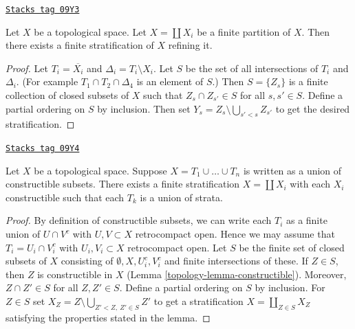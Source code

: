 \begin{lemma}
\label{topology-lemma-partition-refined-by-stratification}
\href{https://stacks.math.columbia.edu/tag/09Y3}{\texttt{Stacks tag 09Y3}}

Let $X$ be a topological space. Let $X = \coprod X_i$ be a finite partition
of $X$. Then there exists a finite stratification of $X$ refining it.
\end{lemma}

\begin{proof}
Let $T_i = \overline{X_i}$ and $\Delta_i = T_i \setminus X_i$.
Let $S$ be the set of all intersections of $T_i$ and $\Delta_i$.
(For example $T_1 \cap T_2 \cap \Delta_4$ is an element of $S$.)
Then $S = \{Z_s\}$ is a finite collection of closed subsets of $X$ such that
$Z_s \cap Z_{s'} \in S$ for all $s, s' \in S$. Define a partial ordering
on $S$ by inclusion. Then set $Y_s = Z_s \setminus \bigcup_{s' < s} Z_{s'}$
to get the desired stratification.
\end{proof}

\begin{lemma}
\label{topology-lemma-constructible-partition-refined-by-stratification}
\href{https://stacks.math.columbia.edu/tag/09Y4}{\texttt{Stacks tag 09Y4}}

Let $X$ be a topological space. Suppose $X = T_1 \cup \ldots \cup T_n$
is written as a union of constructible subsets. There exists a finite
stratification $X = \coprod X_i$ with each $X_i$ constructible
such that each $T_k$ is a union of strata.
\end{lemma}

\begin{proof}

By definition of constructible subsets, we can write each $T_i$ as a
finite union of $U \cap V^c$ with $U, V \subset X$ retrocompact open.
Hence we may assume that $T_i = U_i \cap V_i^c$
with $U_i, V_i \subset X$ retrocompact open. Let $S$ be the
finite set of closed subsets of $X$ consisting of
$\emptyset, X, U_i^c, V_i^c$ and finite intersections of these.
If $Z \in S$, then $Z$ is constructible in $X$
(Lemma \ref{topology-lemma-constructible}).
Moreover, $Z \cap Z' \in S$ for all $Z, Z' \in S$.
Define a partial ordering on $S$ by inclusion. For $Z \in S$ set
$X_Z = Z \setminus \bigcup_{Z' < Z,\ Z' \in S} Z'$
to get a stratification $X = \coprod_{Z \in S} X_Z$
satisfying the properties stated in the lemma.
\end{proof}

